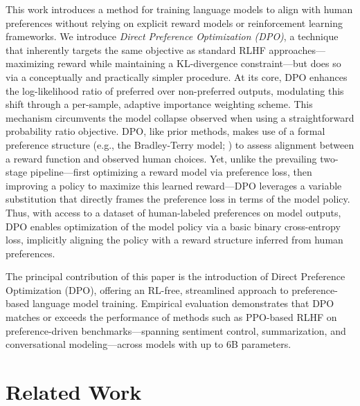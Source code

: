 This work introduces a method for training language models to align with human preferences without relying on explicit reward models or reinforcement learning frameworks. We introduce \textit{{Direct Preference Optimization} (DPO)}, a technique that inherently targets the same objective as standard RLHF approaches—maximizing reward while maintaining a KL-divergence constraint—but does so via a conceptually and practically simpler procedure. At its core, DPO enhances the log-likelihood ratio of preferred over non-preferred outputs, modulating this shift through a per-sample, adaptive importance weighting scheme. This mechanism circumvents the model collapse observed when using a straightforward probability ratio objective. DPO, like prior methods, makes use of a formal preference structure (e.g., the Bradley-Terry model; \cite{bradley1952rankanalysis}) to assess alignment between a reward function and observed human choices. Yet, unlike the prevailing two-stage pipeline—first optimizing a reward model via preference loss, then improving a policy to maximize this learned reward—DPO leverages a variable substitution that directly frames the preference loss in terms of the model policy. Thus, with access to a dataset of human-labeled preferences on model outputs, DPO enables optimization of the model policy via a basic binary cross-entropy loss, implicitly aligning the policy with a reward structure inferred from human preferences.

The principal contribution of this paper is the introduction of Direct Preference Optimization (DPO), offering an RL-free, streamlined approach to preference-based language model training. Empirical evaluation demonstrates that DPO matches or exceeds the performance of methods such as PPO-based RLHF on preference-driven benchmarks—spanning sentiment control, summarization, and conversational modeling—across models with up to 6B parameters.

\section{Related Work}

